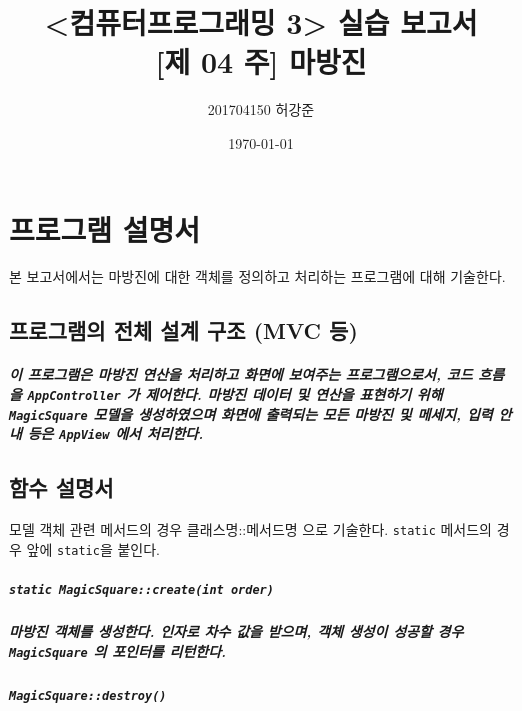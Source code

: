 \documentclass[UTF8]{report}
\title{%
    <컴퓨터프로그래밍 3> 실습 보고서 \\ 
    \large [제 04 주] 마방진}
\author{201704150 허강준}
\date{\today}
\begin{document}
    \maketitle
    \tableofcontents

    \chapter{프로그램 설명서}
        본 보고서에서는 마방진에 대한 객체를 정의하고 처리하는 프로그램에 대해 기술한다.

        \section{프로그램의 전체 설계 구조 (MVC 등)}
            
            \paragraph{%
                \normalfont 이 프로그램은 마방진 연산을 처리하고 화면에 보여주는 프로그램으로서, 코드 흐름을 \texttt{AppController} 가 제어한다. 마방진 데이터 및 연산을 표현하기 위해 \texttt{MagicSquare} 모델을 생성하였으며 화면에 출력되는 모든 마방진 및 메세지, 입력 안내 등은 \texttt{AppView} 에서 처리한다. 
            }

            
        \section{함수 설명서}

            모델 객체 관련 메서드의 경우 클래스명::메서드명 으로 기술한다. \texttt{static} 메서드의 경우 앞에 \texttt{static}을 붙인다.
            
            \paragraph{\texttt{static MagicSquare::create(int order)}}
            \paragraph{%
                \normalfont 마방진 객체를 생성한다. 인자로 차수 값을 받으며, 객체 생성이 성공할 경우 \texttt{MagicSquare} 의 포인터를 리턴한다.
            }

            \paragraph{\texttt{MagicSquare::destroy()}}
\end{document}
